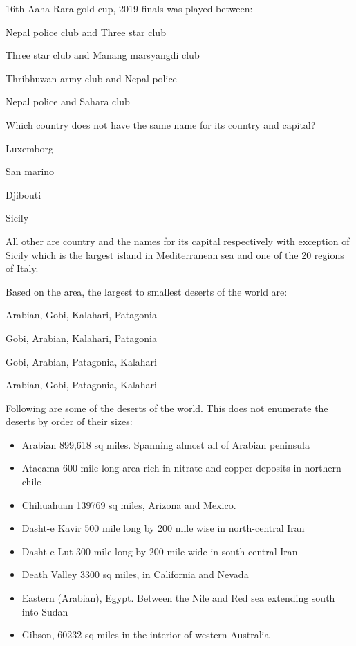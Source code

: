 \begin{questions}
\question 16th Aaha-Rara gold cup, 2019 finals was played between:
  \begin{items}
  \item* Nepal police club and Three star club
  \item Three star club and Manang marsyangdi club
  \item Thribhuwan army club and Nepal police
  \item Nepal police and Sahara club
  \end{items}

\question Which country does not have the same name for its country and capital?
  \begin{items}
  \item Luxemborg
  \item San marino
  \item Djibouti
  \item* Sicily
  \end{items}
  \begin{solution}
      All other are country and the names for its capital respectively with exception of Sicily which is the largest island in Mediterranean sea and one of the 20 regions of Italy.
  \end{solution}

\question Based on the area, the largest to smallest deserts of the world are:
  \begin{items}
  \item* Arabian, Gobi, Kalahari, Patagonia
  \item Gobi, Arabian, Kalahari, Patagonia
  \item Gobi, Arabian, Patagonia, Kalahari
  \item Arabian, Gobi, Patagonia, Kalahari
  \end{items}


\begin{solution}

Following are some of the deserts of the world. This does not enumerate the deserts by order of their sizes:

\begin{itemize}
    \item Arabian 899,618 sq miles. Spanning almost all of Arabian peninsula
    \item Atacama 600 mile long area rich in nitrate and copper deposits in northern chile
    \item Chihuahuan 139769 sq miles, Arizona and Mexico.
    \item Dasht-e Kavir 500 mile long by 200 mile wise in north-central Iran
    \item Dasht-e Lut 300 mile long by 200 mile wide in south-central Iran
    \item Death Valley 3300 sq miles, in California and Nevada
    \item Eastern (Arabian), Egypt. Between the Nile and Red sea extending south into Sudan
    \item Gibson, 60232 sq miles in the interior of western Australia
\end{itemize}


\end{solution}
\end{questions}
